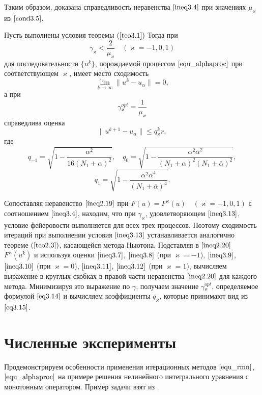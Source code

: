 Таким образом, доказана справедливость неравенства $\eqref{ineq3.4}$ при значениях $\mu_\varkappa$ из $\eqref{cond3.5}$.
\begin{theorem}\label{teo3.2}
	Пусть выполнены условия теоремы $(\ref{teo3.1})$ Тогда при
	\begin{equation}\label{ineq3.13}
	\gamma _\varkappa <\frac{2}{\mu _\varkappa}\quad (\varkappa=-1,0,1)
	\end{equation}
	для последовательности $\{u^k\}$, порождаемой процессом $\eqref{equ_alphaproc}$ при соответствующем $\varkappa$, имеет место сходимость $$\lim_{k\to\infty}\|u^k-u_\alpha\|=0,$$ а при 
	\begin{equation}\label{eq3.14}
	\gamma{_\varkappa^{opt}}=\frac{1}{\mu_\varkappa}
	\end{equation}
	справедлива оценка $$\|u^{k+1}-u_\alpha\|\le q{_\varkappa^k}r,$$ где
	$$q_{-1}=\sqrt{1-\frac{\alpha^2}{16(N_1+\alpha)^2}}, \quad q_0=\sqrt{1-\frac{\alpha^2\bar\alpha^2}{(N_1+\alpha)^2(N_1+\bar\alpha)^2}},$$
	\begin{equation}\label{eq3.15}
	q_1=\sqrt{1-\frac{\alpha^2\bar\alpha^4}{(N_1+\bar\alpha)^4}}.
	\end{equation}
\end{theorem}
\proof Сопоставляя неравенство $\eqref{ineq2.19}$ при $F(u)=F^\varkappa(u) \quad (\varkappa=-1,0,1)$ с соотношением $\eqref{ineq3.4}$, находим, что при $\gamma_\varkappa$, удовлетворяющем  $\eqref{ineq3.13}$, условие фейеровости выполняется для всех трех процессов. Поэтому сходимость итераций при выполнении условия $\eqref{ineq3.13}$ устанавливается аналогично теореме $(\ref{teo2.3})$, касающейся метода Ньютона. Подставляя в $\eqref{ineq2.20}$ $F^\varkappa(u^k)$ и используя оценки $\eqref{ineq3.7}$, $\eqref{ineq3.8}$ (при $\varkappa=-1$), $\eqref{ineq3.9}$, $\eqref{ineq3.10}$ (при $\varkappa=0$), $\eqref{ineq3.11}$, $\eqref{ineq3.12}$ (при $\varkappa=1$), вычисляем выражение в круглых скобках в правой части неравенства $\eqref{ineq2.20}$ для каждого метода. Минимизируя это выражение по $\gamma$, получаем значение $\gamma{_\varkappa^{opt}}$, определяемое формулой $\eqref{eq3.14}$ и вычисляем коэффициенты $q_\varkappa$, которые принимают вид из $\eqref{eq3.15}$.

\newpage
\section{Численные эксперименты}

Продемонстрируем особенности применения итерационных методов $\eqref{equ_rmn}$, $\eqref{equ_alphaproc}$ на примере решения нелинейного интегрального уравнения с монотонным оператором. Пример задачи взят из \cite{Tau2002}.

